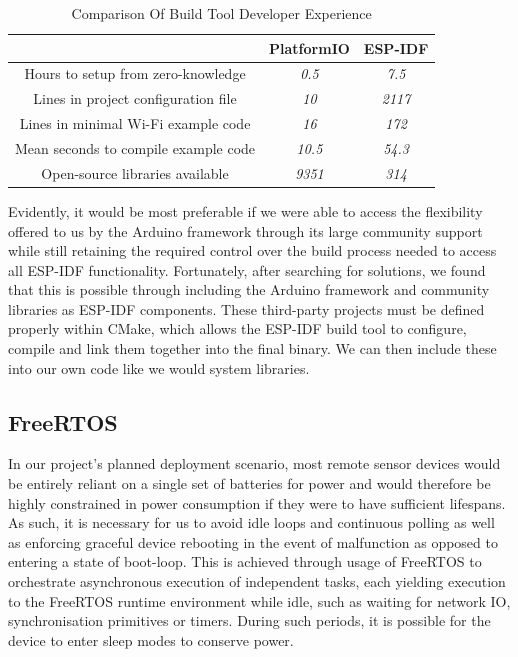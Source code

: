 \documentclass[conference]{IEEEtran}
\begin{document}
\begin{table}[ht]
\caption{Comparison Of Build Tool Developer Experience}
\begin{center}
\begin{tabular}{|c|c|c|}
\hline
& \textbf{PlatformIO} & \textbf{ESP-IDF} \\
\hline
Hours to setup from zero-knowledge & \textit{0.5} & \textit{7.5} \\
\hline
Lines in project configuration file & \textit{10} & \textit{2117} \\
\hline
Lines in minimal Wi-Fi example code & \textit{16} & \textit{172} \\
\hline
Mean seconds to compile example code & \textit{10.5} & \textit{54.3} \\
\hline
Open-source libraries available\cite{pio-libraries}\cite{idf-libraries} & \textit{9351} & \textit{314} \\
\hline
\end{tabular}
\label{build_tool_table}
\end{center}
\end{table}


Evidently, it would be most preferable if we were able to access the flexibility offered to us by the Arduino framework through its large community support while still retaining the required control over the build process needed to access all ESP-IDF functionality. Fortunately, after searching for solutions, we found that this is possible through including the Arduino framework and community libraries as ESP-IDF components. These third-party projects must be defined properly within CMake, which allows the ESP-IDF build tool to configure, compile and link them together into the final binary. We can then include these into our own code like we would system libraries.


\subsection{FreeRTOS}

In our project's planned deployment scenario, most remote sensor devices would be entirely reliant on a single set of batteries for power and would therefore be highly constrained in power consumption if they were to have sufficient lifespans. As such, it is necessary for us to avoid idle loops and continuous polling as well as enforcing graceful device rebooting in the event of malfunction as opposed to entering a state of boot-loop. This is achieved through usage of FreeRTOS to orchestrate asynchronous execution of independent tasks, each yielding execution to the FreeRTOS runtime environment while idle, such as waiting for network IO, synchronisation primitives or timers. During such periods, it is possible for the device to enter sleep modes to conserve power.
\end{document}
